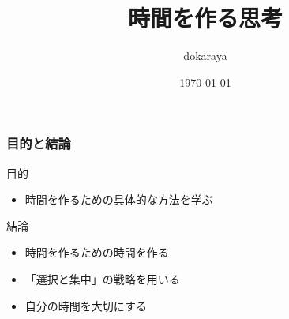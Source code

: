 \documentclass[dvipdfmx]{beamer}
\theoremstyle{example}
\begin{document}
\title[時間を作る思考]{時間を作る思考}
\author[dokaraya]{dokaraya}
\date{\today}

\begin{frame}
\titlepage
\nocite{*}
\end{frame}

\begin{frame}
  \frametitle{目的と結論}
  \begin{block}{目的}
    \begin{itemize}
      \item 時間を作るための具体的な方法を学ぶ
    \end{itemize}
  \end{block}

  \begin{exampleblock}{結論}
    \begin{itemize}
      \item 時間を作るための時間を作る
      \item 「選択と集中」の戦略を用いる
      \item 自分の時間を大切にする
    \end{itemize}
  \end{exampleblock}
\end{frame}
\end{document}

